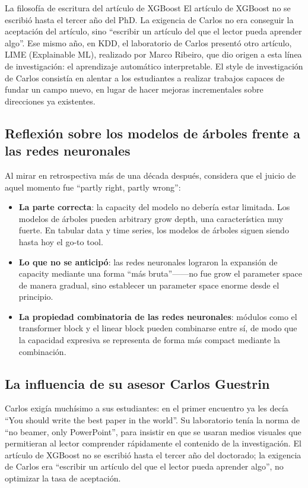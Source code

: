 \documentclass[a4paper]{article}
\begin{document}
\begin{knowledgebox}{La filosofía de escritura del artículo de XGBoost}
El artículo de XGBoost no se escribió hasta el tercer año del PhD. La exigencia de Carlos no era conseguir la aceptación del artículo, sino ``escribir un artículo del que el lector pueda aprender algo''. Ese mismo año, en KDD, el laboratorio de Carlos presentó otro artículo, LIME (Explainable ML), realizado por Marco Ribeiro, que dio origen a esta línea de investigación: el aprendizaje automático interpretable. El style de investigación de Carlos consistía en alentar a los estudiantes a realizar trabajos capaces de fundar un campo nuevo, en lugar de hacer mejoras incrementales sobre direcciones ya existentes.
\end{knowledgebox}

\subsection{Reflexión sobre los modelos de árboles frente a las redes neuronales}

Al mirar en retrospectiva más de una década después, considera que el juicio de aquel momento fue ``partly right, partly wrong'':

\begin{itemize}
    \item \textbf{La parte correcta}: la capacity del modelo no debería estar limitada. Los modelos de árboles pueden arbitrary grow depth, una característica muy fuerte. En tabular data y time series, los modelos de árboles siguen siendo hasta hoy el go-to tool.
    \item \textbf{Lo que no se anticipó}: las redes neuronales lograron la expansión de capacity mediante una forma ``más bruta''------no fue grow el parameter space de manera gradual, sino establecer un parameter space enorme desde el principio.
    \item \textbf{La propiedad combinatoria de las redes neuronales}: módulos como el transformer block y el linear block pueden combinarse entre sí, de modo que la capacidad expresiva se representa de forma más compact mediante la combinación.
\end{itemize}

\subsection{La influencia de su asesor Carlos Guestrin}

Carlos exigía muchísimo a sus estudiantes: en el primer encuentro ya les decía ``You should write the best paper in the world''. Su laboratorio tenía la norma de ``no beamer, only PowerPoint'', para insistir en que se usaran medios visuales que permitieran al lector comprender rápidamente el contenido de la investigación. El artículo de XGBoost no se escribió hasta el tercer año del doctorado; la exigencia de Carlos era ``escribir un artículo del que el lector pueda aprender algo'', no optimizar la tasa de aceptación.
\end{document}
